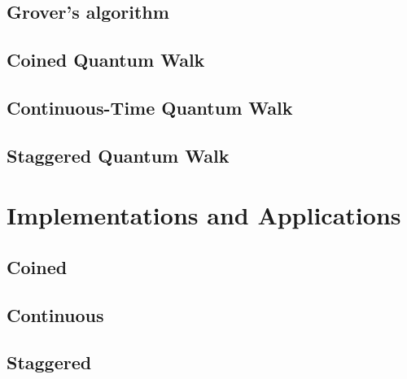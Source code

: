 \documentclass[
oneside,
11pt, a4paper,
footinclude=true,
headinclude=true,
cleardoublepage=empty
]{scrbook}
\begin{document}
\section{Grover's algorithm}

\section{Coined Quantum Walk}

\section{Continuous-Time Quantum Walk}

\section{Staggered Quantum Walk}


\chapter{Implementations and Applications}\label{chap:qiskitImplementation}
\section{Coined}\label{coinedQWQiskit}

\section{Continuous}

\section{Staggered}

\end{document}
